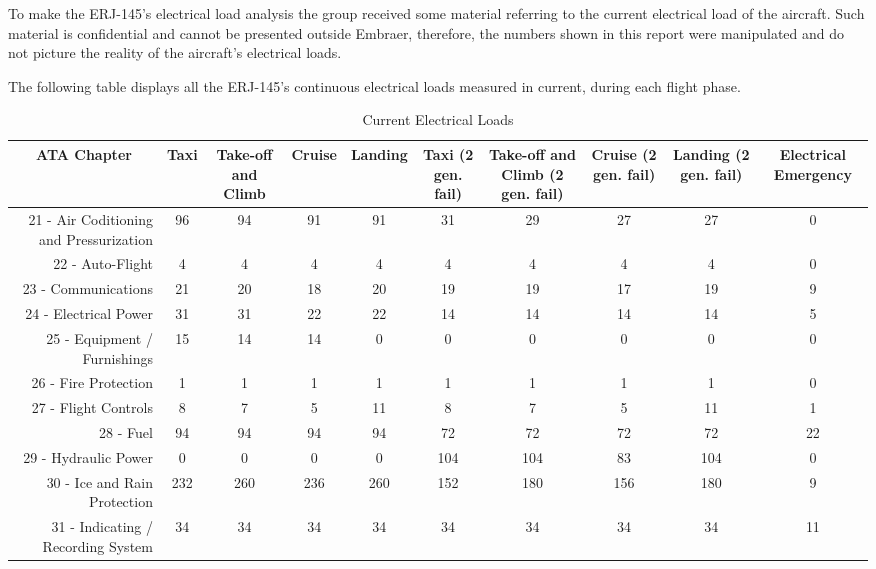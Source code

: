 To make the ERJ-145's electrical load analysis the group received some material referring to the current electrical load of the aircraft. Such material is confidential and cannot be presented outside Embraer, therefore, the numbers shown in this report were manipulated and do not picture the reality of the aircraft's electrical loads.

The following table displays all the ERJ-145's continuous electrical loads measured in current, during each flight phase.

\begin{table}[htbp]
  \centering
  \scriptsize
  \caption{Current Electrical Loads}
    \begin{tabular}{rccccccccc}
    \toprule
    \multicolumn{1}{c}{ATA Chapter} & Taxi  & Take-off and Climb & Cruise & Landing & Taxi (2 gen. fail) & Take-off and Climb (2 gen. fail) & Cruise  (2 gen. fail) & Landing  (2 gen. fail) & Electrical Emergency \\
    \midrule
    21 - Air Coditioning and Pressurization & 96    & 94    & 91    & 91    & 31    & 29    & 27    & 27    & 0 \\
    22 - Auto-Flight & 4     & 4     & 4     & 4     & 4     & 4     & 4     & 4     & 0 \\
    23 - Communications & 21    & 20    & 18    & 20    & 19    & 19    & 17    & 19    & 9 \\
    24 - Electrical Power & 31    & 31    & 22    & 22    & 14    & 14    & 14    & 14    & 5 \\
    25 - Equipment / Furnishings & 15    & 14    & 14    & 0     & 0     & 0     & 0     & 0     & 0 \\
    26 - Fire Protection & 1     & 1     & 1     & 1     & 1     & 1     & 1     & 1     & 0 \\
    27 - Flight Controls & 8     & 7     & 5     & 11    & 8     & 7     & 5     & 11    & 1 \\
    28 - Fuel & 94    & 94    & 94    & 94    & 72    & 72    & 72    & 72    & 22 \\
    29 - Hydraulic Power & 0     & 0     & 0     & 0     & 104   & 104   & 83    & 104   & 0 \\
    30 - Ice and Rain Protection & 232   & 260   & 236   & 260   & 152   & 180   & 156   & 180   & 9 \\
    31 - Indicating / Recording System & 34    & 34    & 34    & 34    & 34    & 34    & 34    & 34    & 11 \\

\end{tabular}
\end{table}

